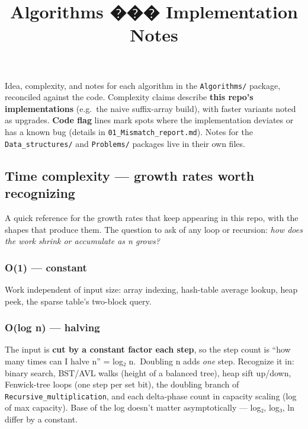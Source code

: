 \documentclass[
  10pt,
  letterpaper,
  onecolumn]{article}
\title{Algorithms ��� Implementation Notes}
\author{}
\date{}
\begin{document}
\maketitle

{
\hypersetup{linkcolor=black}
\setcounter{tocdepth}{2}
\tableofcontents
}
Idea, complexity, and notes for each algorithm in the
\texttt{Algorithms/} package, reconciled against the code. Complexity
claims describe \textbf{this repo's implementations} (e.g.~the naive
suffix-array build), with faster variants noted as upgrades.
\textbf{Code flag} lines mark spots where the implementation deviates or
has a known bug (details in \texttt{01\_Mismatch\_report.md}). Notes for
the \texttt{Data\_structures/} and \texttt{Problems/} packages live in
their own files.

\hypertarget{time-complexity-growth-rates-worth-recognizing}{%
\subsection{Time complexity --- growth rates worth
recognizing}\label{time-complexity-growth-rates-worth-recognizing}}

A quick reference for the growth rates that keep appearing in this repo,
with the shapes that produce them. The question to ask of any loop or
recursion: \emph{how does the work shrink or accumulate as n grows?}

\hypertarget{o1-constant}{%
\subsubsection{O(1) --- constant}\label{o1-constant}}

Work independent of input size: array indexing, hash-table average
lookup, heap peek, the sparse table's two-block query.

\hypertarget{olog-n-halving}{%
\subsubsection{O(log n) --- halving}\label{olog-n-halving}}

The input is \textbf{cut by a constant factor each step}, so the step
count is ``how many times can I halve n'' = log₂ n.~Doubling n adds
\emph{one} step. Recognize it in: binary search, BST/AVL walks (height
of a balanced tree), heap sift up/down, Fenwick-tree loops (one step per
set bit), the doubling branch of \texttt{Recursive\_multiplication}, and
each delta-phase count in capacity scaling (log of max capacity). Base
of the log doesn't matter asymptotically --- log₂, log₃, ln differ by a
constant.
\end{document}
